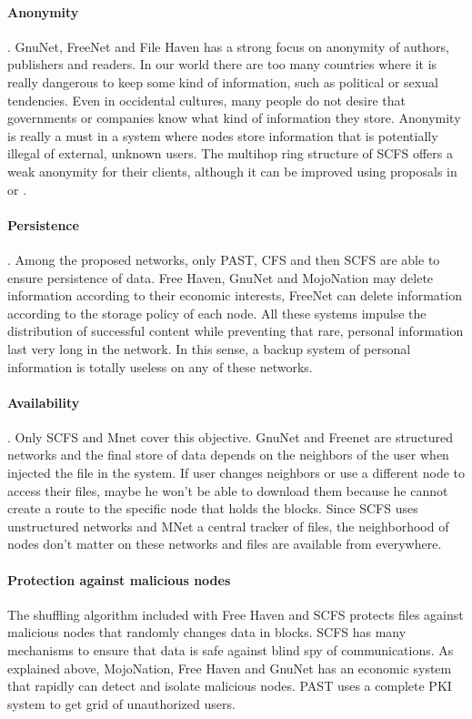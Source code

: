 \documentclass{llncs}
\begin{document}
\paragraph{Anonymity}. GnuNet, FreeNet and File Haven has a strong focus on anonymity of authors, publishers and readers. In our world there are too many countries where it is really dangerous to keep some kind of information, such as political or sexual tendencies. Even in occidental cultures, many people do not desire that governments or companies know what kind of information they store. Anonymity is really a must in a system where nodes store information that is potentially illegal of external, unknown users. The multihop ring structure of SCFS offers a weak anonymity for their clients, although it can be improved using proposals in \cite{TOR} or \cite{TARZAN}.

\paragraph{Persistence}. Among the proposed networks, only PAST, CFS and then SCFS are able to ensure persistence of data. Free Haven, GnuNet and MojoNation may delete information according to their economic interests, FreeNet can delete information according to the storage policy of each node. All these systems impulse the distribution of successful content while preventing that rare, personal information last very long in the network. In this sense, a backup system of personal information is totally useless on any of these networks.

\paragraph{Availability}. Only SCFS and Mnet cover this objective. GnuNet and Freenet are structured networks and the final store of data depends on the neighbors of the user when injected the file in the system. If user changes neighbors or use a different node to access their files, maybe he won't be able to download them because he cannot create a route to the specific node that holds the blocks. Since SCFS uses unstructured networks and MNet a central tracker of files, the neighborhood of nodes don't matter on these networks and files are available from everywhere.

\paragraph{Protection against malicious nodes} The shuffling algorithm included with Free Haven and SCFS protects files against malicious nodes that randomly changes data in blocks. SCFS has many mechanisms to ensure that data is safe against blind spy of communications. As explained above, MojoNation, Free Haven and GnuNet has an economic system that rapidly can detect and isolate malicious nodes. PAST uses a complete PKI system to get grid of unauthorized users.
\end{document}
